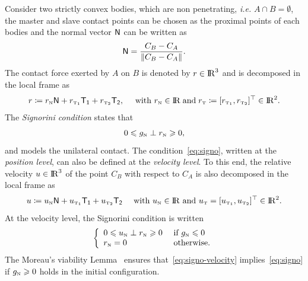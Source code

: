 {Consider two strictly convex bodies, which are non penetrating, {\it i.e.}  $A \cap B = \emptyset$, the master and slave contact points can be chosen as the proximal points of each bodies and the normal vector  ${\sf N}$ can be written as
\begin{equation}
  \label{eq:normal}
  {\sf N} = \Frac{C_B-C_A}{\|C_B-C_A\|}.
\end{equation}
%
The contact force exerted by $A$ on $B$ is denoted by $r \in \mathrm{I\!R}^3$ and is decomposed in the local frame as
\begin{equation}
  \label{eq:reaction}
  r \coloneqq r_{\n} {\sf N} +   r_{\tone}{\sf T_1} + r_{\ttwo}{\sf T_2}  ,\quad \text{ with  } r_{\n} \in \RR\;\text{and}\; r_{\t}\coloneqq[r_{\tone},r_{\ttwo}]^\top \in \RR^2.
\end{equation}
%
The \emph{Signorini condition} states that
\begin{equation}
  \label{eq:signo}
  0 \leq g_{\n} \perp r_\n \geq 0,
\end{equation}
and models the unilateral contact. The condition~\eqref{eq:signo}, written at the \emph{position level}, can also be defined at the \emph{velocity level}.
To this end, the relative velocity $u \in \mathrm{I\!R}^3$ of the point $C_{B}$ with respect to $C_{A}$ is also decomposed in the local frame  as
\begin{equation}
  u \coloneqq  u_{\hbox{\tiny{N}}} {\sf N} +  u_{{\hbox{\tiny{T}}}_{\hbox{\tiny{1}}}}{\sf T_1} + u_{{\hbox{\tiny{T}}}_{\hbox{\tiny{2}}}}{\sf T_2}  \quad \text{ with } u_{\hbox{\tiny{N}}} \in \mathrm{I\!R} \text{ and } u_{\hbox{\tiny{T}}}=[u_{{\hbox{\tiny{T}}}_{\hbox{\tiny{1}}}},u_{{\hbox{\tiny{T}}}_{\hbox{\tiny{2}}}}]^\top  \in \mathrm{I\!R}^2.
\end{equation}
%
At the velocity level, the Signorini condition is written 
\begin{equation}
  \label{eq:signo-velocity}
  \left\{\begin{array}{ll}
  0 \leq u_{\n} \perp r_\n \geq 0  &\text{ if } g_{\n} \leq 0 \\
  r_{\n} =0 &\text{ otherwise}.
\end{array}\right.
\end{equation}
The Moreau's viability Lemma~\cite{Moreau1988} ensures that~\eqref{eq:signo-velocity} implies~\eqref{eq:signo} if $g_{{\hbox{\tiny{N}}}}\geqslant 0$ holds in the initial configuration.

}
